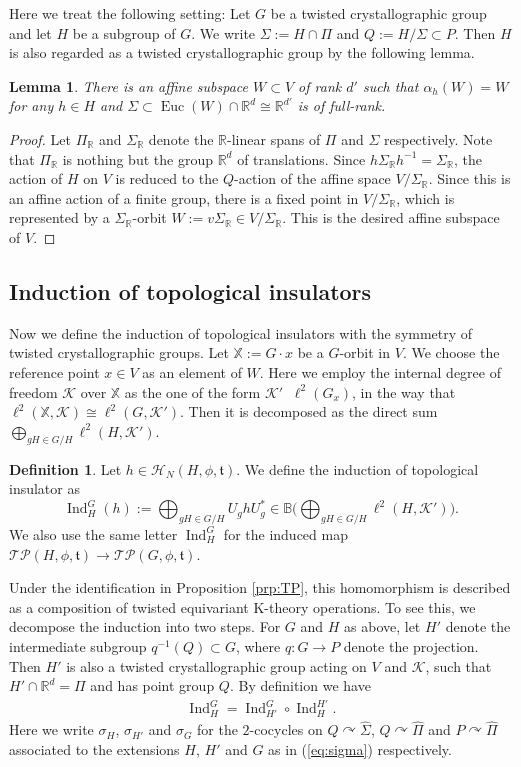 \documentclass[11pt]{amsart}
\theoremstyle{definition}
\newtheorem{defn}[equation]{Definition}
\theoremstyle{plain}
\newtheorem{lem}[equation]{Lemma}
\theoremstyle{remark}
\newcommand{\bB}{\mathbb{B}}
\newcommand{\bR}{\mathbb{R}}
\newcommand{\bX}{\mathbb{X}}
\newcommand{\cH}{\mathcal{H}}
\newcommand{\ft}{\mathfrak{t}}
\newcommand{\sK}{\mathscr{K}}
\DeclareMathOperator{\Ind}{Ind}
\DeclareMathOperator{\Euc}{Euc}
\DeclareMathOperator{\hotimes}{\hat{\otimes}}
\begin{document}
Here we treat the following setting: Let $G$ be a twisted crystallographic group and let $H$ be a subgroup of $G$. We write $\Sigma := H \cap \Pi$ and $Q:=H/\Sigma \subset P$. Then $H$ is also regarded as a twisted crystallographic group by the following lemma.  
\begin{lem}\label{lem:affsub}
There is an affine subspace $W \subset V $ of rank $d'$ such that $\alpha_h(W) = W$ for any $h \in H$ and $\Sigma \subset \Euc(W) \cap \bR^d \cong \bR^{d'}$ is of full-rank. 
\end{lem}
\begin{proof}
Let $\Pi_\bR$ and $\Sigma _\bR$ denote the $\bR$-linear spans of $\Pi$ and $\Sigma$ respectively. Note that $\Pi_\bR$ is nothing but the group $\bR^d$ of translations. Since $h \Sigma_\bR h^{-1} = \Sigma_\bR$, the action of $H$ on $V$ is reduced to the $Q$-action of the affine space $V/\Sigma_\bR$. Since this is an affine action of a finite group, there is a fixed point in $V/\Sigma_\bR$, which is represented by a $\Sigma_\bR$-orbit $W:=v \Sigma_\bR \in V/\Sigma_\bR$. This is the desired affine subspace of $V$. 
\end{proof}

\subsection{Induction of topological insulators}
Now we define the induction of topological insulators with the symmetry of twisted crystallographic groups.  Let $\bX:=G \cdot x$ be a $G$-orbit in $V$. We choose the reference point $x \in V$ as an element of $W$.
Here we employ the internal degree of freedom $\sK$ over $\bX$ as the one of the form $\sK' \hotimes \ell^2(G_x)$, in the way that $\ell^2(\bX ,\sK) \cong \ell^2(G, \sK')$. 
Then it is decomposed as the direct sum $\bigoplus_{gH \in G/H} \ell^2(H,\sK')$.
\begin{defn}\label{defn:induction}
Let $h \in \cH_N(H,\phi,\ft)$. We define the induction of topological insulator as 
\[ \Ind _H^G (h):= \bigoplus_{gH \in G/H} U_ghU_g^*  \in \bB \Big(\bigoplus_{gH \in G/H} \ell^2(H, \sK' )\Big).  \]
We also use the same letter $\Ind_H^G$ for the induced map $\mathscr{TP}(H,\phi,\ft) \to \mathscr{TP}(G,\phi,\ft)$. 
\end{defn}
Under the identification in Proposition \ref{prp:TP}, this homomorphism is described as a composition of twisted equivariant K-theory operations. To see this, we decompose the induction into two steps. For $G$ and $H$ as above, let $H'$ denote the intermediate subgroup $q^{-1}(Q) \subset G$, where $q \colon G \to P$ denote the projection. Then $H'$ is also a twisted crystallographic group acting on $V$ and $\sK$, such that $H' \cap \bR^d = \Pi$ and has point group $Q$. By definition we have 
\begin{align}
\Ind _H^G = \Ind_{H'}^G \circ \Ind_H^{H'}. \label{eq:indstep}
\end{align} 
Here we write $\sigma_H$, $\sigma_{H'}$ and $\sigma_G$ for the $2$-cocycles on $Q \curvearrowright \hat{\Sigma}$, $Q \curvearrowright \hat{\Pi}$ and $P \curvearrowright \hat{\Pi}$ associated to the extensions $H$, $H'$ and $G$ as in (\ref{eq:sigma}) respectively. 
\end{document}
